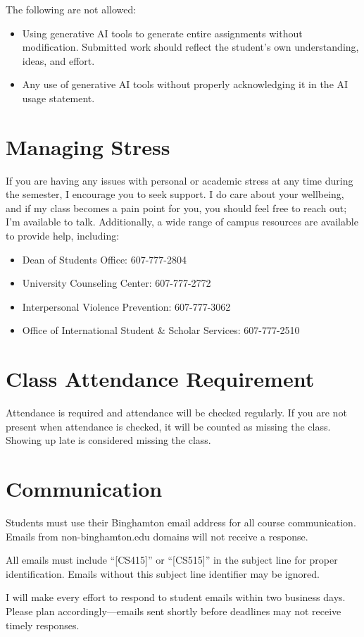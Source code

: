 \documentclass[11pt,article,oneside]{memoir} %
\begin{document}
The following are not allowed:

\begin{itemize}
    \item Using generative AI tools to generate entire assignments without modification. Submitted work should reflect the student's own understanding, ideas, and effort.
    \item Any use of generative AI tools without properly acknowledging it in the AI usage statement.
\end{itemize}


\section{Managing Stress}

If you are having any issues with personal or academic stress at any time during the semester, I encourage you to seek support.
I do care about your wellbeing, and if my class becomes a pain point for you, you should feel free to reach out; I'm available to talk.
Additionally, a wide range of campus resources are available to provide help, including:
\begin{itemize}
    \item Dean of Students Office: 607-777-2804
    \item University Counseling Center: 607-777-2772
    \item Interpersonal Violence Prevention: 607-777-3062
    \item Office of International Student \& Scholar Services: 607-777-2510
\end{itemize}

\section{Class Attendance Requirement}

Attendance is required and attendance will be checked regularly.
If you are not present when attendance is checked, it will be counted as missing the class.
Showing up late is considered missing the class.

\section{Communication}

Students must use their Binghamton email address for all course communication.
Emails from non-binghamton.edu domains will not receive a response.

All emails must include ``[CS415]'' or ``[CS515]'' in the subject line for proper identification.
Emails without this subject line identifier may be ignored.

I will make every effort to respond to student emails within two business days.
Please plan accordingly—emails sent shortly before deadlines may not receive timely responses.
\end{document}
